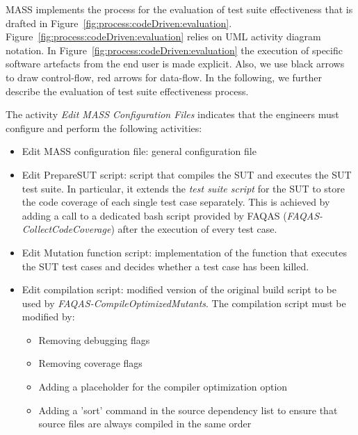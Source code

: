 MASS implements the process for the evaluation of test suite effectiveness that is drafted in Figure~\ref{fig:process:codeDriven:evaluation}. Figure~\ref{fig:process:codeDriven:evaluation} relies on UML activity diagram notation. In Figure~\ref{fig:process:codeDriven:evaluation} the execution of specific software artefacts from the end user is made explicit. Also, we use black arrows to draw control-flow, red arrows for data-flow. In the following, we further describe the evaluation of test suite effectiveness process.


The activity \emph{Edit MASS Configuration Files} indicates that the engineers must configure and perform the following activities:
\begin{itemize}
	\item Edit MASS configuration file: general configuration file
	\item Edit PrepareSUT script: script that compiles the SUT and executes the SUT test suite. In particular,  it extends the \emph{test suite script} for the SUT to store the code coverage of each single test case separately. This is achieved by adding a call to a dedicated bash script provided by FAQAS (\emph{FAQAS-CollectCodeCoverage}) after the execution of every test case.
	\item Edit Mutation function script: implementation of the function that executes the SUT test cases and decides whether a test case has been killed.
	\item Edit compilation script: modified version of the original build script to be used by \emph{FAQAS-}\emph{Compile\-OptimizedMutants}. The compilation script must be modified by:
	\begin{itemize}
	\item Removing debugging flags
	\item Removing coverage flags
	\item Adding a placeholder for the compiler optimization option
	\item Adding a 'sort' command in the source dependency list to ensure that source files are always compiled in the same order
	\end{itemize}
\end{itemize}


